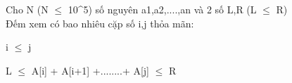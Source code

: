 Cho N (N $\le$ 10^5) số nguyên a1,a2,....,an và 2 số L,R (L $\le$ R)    
\\



    Đếm xem có bao nhiêu cặp số i,j thỏa mãn:   



    i  $\le$  j   



    L $\le$  A[i] + A[i+1] +........+ A[j]  $\le$ R   

\